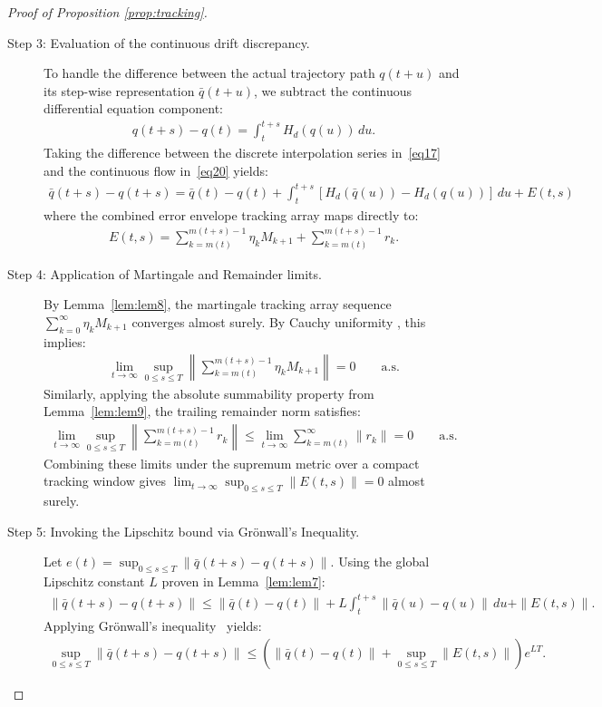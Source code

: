 \documentclass[10pt,a4paper]{amsart}
\begin{document}
\begin{proof}[Proof of Proposition \ref{prop:tracking}]
\begin{description}
    \item[Step 3: Evaluation of the continuous drift discrepancy.] To handle the difference between the actual trajectory path $q(t+u)$ and its step-wise representation $\bar{q}(t+u)$, we subtract the continuous differential equation component:
    \begin{align}
    q(t+s) - q(t) = \int_{t}^{t+s} H_d(q(u)) \, du \label{eq20}.
    \end{align}
    Taking the difference between the discrete interpolation series in~\eqref{eq17} and the continuous flow in~\eqref{eq20}  yields:
    \begin{align}
    \bar{q}(t+s) - q(t+s) = \bar{q}(t) - q(t) + \int_{t}^{t+s} \left[ H_d(\bar{q}(u)) - H_d(q(u)) \right] \, du + E(t,s)
    \end{align}
    where the combined error envelope tracking array maps directly to:
    \begin{align}
    E(t,s) = \sum_{k=m(t)}^{m(t+s)-1} \eta_k M_{k+1} + \sum_{k=m(t)}^{m(t+s)-1} r_k.
    \end{align}

    \item[Step 4: Application of Martingale and Remainder limits.] By Lemma~\ref{lem:lem8}, the martingale tracking array sequence $\sum_{k=0}^{\infty} \eta_k M_{k+1}$ converges almost surely. By Cauchy uniformity \cite{Royden}, this implies:
    \begin{align}
    \lim_{t \to \infty} \sup_{0 \le s \le T} \left\| \sum_{k=m(t)}^{m(t+s)-1} \eta_k M_{k+1} \right\| = 0 \qquad \text{a.s.}
    \end{align}
    Similarly, applying the absolute summability property from Lemma~\ref{lem:lem9}, the trailing remainder norm satisfies:
    \begin{align}
    \lim_{t \to \infty} \sup_{0 \le s \le T} \left\| \sum_{k=m(t)}^{m(t+s)-1} r_k \right\| \le \lim_{t \to \infty} \sum_{k=m(t)}^{\infty} \|r_k\| = 0 \qquad \text{a.s.}
    \end{align}
    Combining these limits under the supremum metric over a compact tracking window gives $\lim_{t \to \infty} \sup_{0 \le s \le T} \|E(t,s)\| = 0$ almost surely.

    \item[Step 5: Invoking the Lipschitz bound via Grönwall's Inequality.] Let $e(t) = \sup_{0 \le s \le T} \|\bar{q}(t+s) - q(t+s)\|$. Using the global Lipschitz constant $L$ proven in Lemma~\ref{lem:lem7}:
    \begin{align}
    \|\bar{q}(t+s) - q(t+s)\| \le \|\bar{q}(t) - q(t)\| + L \int_{t}^{t+s} \|\bar{q}(u) - q(u)\| \, du + \|E(t,s)\|.
    \end{align}
    Applying Grönwall's inequality~\cite{hirsch2013differential} yields:
    \begin{align}
    \sup_{0 \le s \le T} \|\bar{q}(t+s) - q(t+s)\| \le \left( \|\bar{q}(t) - q(t)\| + \sup_{0 \le s \le T} \|E(t,s)\| \right) e^{LT}.
    \end{align}


\end{description}
\end{proof}
\end{document}
